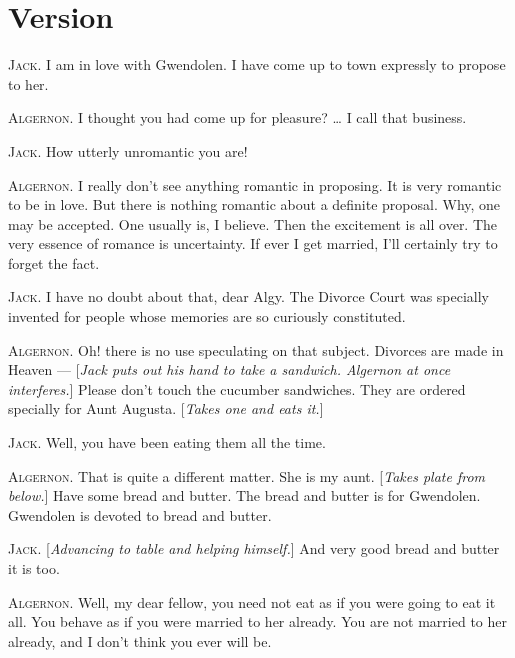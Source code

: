\documentclass{fiche}
\begin{document}
\section{Version}

\begin{version}
\textsc{Jack.} I am in love with Gwendolen. I have come up to town expressly to propose to
her.

\textsc{Algernon.} I thought you had come up for pleasure? \ldots{} I call that business.

\textsc{Jack.} How utterly unromantic you are!

\textsc{Algernon.} I really don't see anything romantic in proposing. It is very romantic to
be in love. But there is nothing romantic about a definite proposal. Why, one may be accepted.
One usually is, I believe. Then the excitement is all over. The very essence of romance is
uncertainty. If ever I get married, I'll certainly try to forget the fact.

\textsc{Jack.} I have no doubt about that, dear Algy. The Divorce Court was specially invented
for people whose memories are so curiously constituted.

\textsc{Algernon.} Oh! there is no use speculating on that subject. Divorces are made in
Heaven --- [\emph{Jack puts out his hand to take a sandwich. Algernon at once interferes.}]
Please don't touch the cucumber sandwiches. They are ordered specially for Aunt Augusta.
[\emph{Takes one and eats it.}]

\textsc{Jack.} Well, you have been eating them all the time.

\textsc{Algernon.} That is quite a different matter. She is my aunt. [\emph{Takes plate from
below.}] Have some bread and butter. The bread and butter is for Gwendolen. Gwendolen is
devoted to bread and butter.

\textsc{Jack.} [\emph{Advancing to table and helping himself.}] And very good bread and butter
it is too.

\textsc{Algernon.} Well, my dear fellow, you need not eat as if you were going to eat it all.
You behave as if you were married to her already. You are not married to her already, and I
don't think you ever will be.
\end{version}

\end{document}
